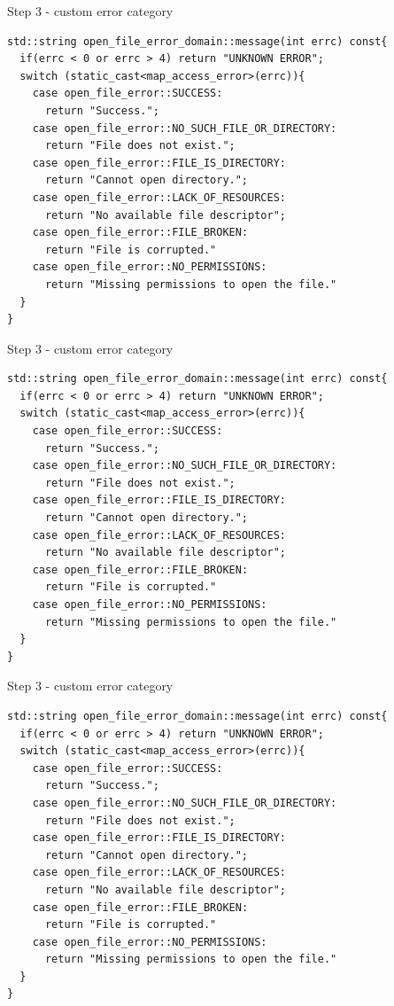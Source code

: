 \documentclass[10pt]{beamer}
\begin{document}
\begin{frame}[fragile]{Step 3 - custom error category}
\begin{verbatim}
std::string open_file_error_domain::message(int errc) const{
  if(errc < 0 or errc > 4) return "UNKNOWN ERROR";
  switch (static_cast<map_access_error>(errc)){
    case open_file_error::SUCCESS:
      return "Success.";
    case open_file_error::NO_SUCH_FILE_OR_DIRECTORY:
      return "File does not exist.";
    case open_file_error::FILE_IS_DIRECTORY:
      return "Cannot open directory.";
    case open_file_error::LACK_OF_RESOURCES:
      return "No available file descriptor";
    case open_file_error::FILE_BROKEN:
      return "File is corrupted."
    case open_file_error::NO_PERMISSIONS:
      return "Missing permissions to open the file."
  }
}
\end{verbatim}
\end{frame}

\begin{frame}[fragile]{Step 3 - custom error category}
\begin{verbatim}
std::string open_file_error_domain::message(int errc) const{
  if(errc < 0 or errc > 4) return "UNKNOWN ERROR";
  switch (static_cast<map_access_error>(errc)){
    case open_file_error::SUCCESS:
      return "Success.";
    case open_file_error::NO_SUCH_FILE_OR_DIRECTORY:
      return "File does not exist.";
    case open_file_error::FILE_IS_DIRECTORY:
      return "Cannot open directory.";
    case open_file_error::LACK_OF_RESOURCES:
      return "No available file descriptor";
    case open_file_error::FILE_BROKEN:
      return "File is corrupted."
    case open_file_error::NO_PERMISSIONS:
      return "Missing permissions to open the file."
  }
}
\end{verbatim}
\end{frame}

\begin{frame}[fragile]{Step 3 - custom error category}
\begin{verbatim}
std::string open_file_error_domain::message(int errc) const{
  if(errc < 0 or errc > 4) return "UNKNOWN ERROR";
  switch (static_cast<map_access_error>(errc)){
    case open_file_error::SUCCESS:
      return "Success.";
    case open_file_error::NO_SUCH_FILE_OR_DIRECTORY:
      return "File does not exist.";
    case open_file_error::FILE_IS_DIRECTORY:
      return "Cannot open directory.";
    case open_file_error::LACK_OF_RESOURCES:
      return "No available file descriptor";
    case open_file_error::FILE_BROKEN:
      return "File is corrupted."
    case open_file_error::NO_PERMISSIONS:
      return "Missing permissions to open the file."
  }
}
\end{verbatim}
\end{frame}
\end{document}
